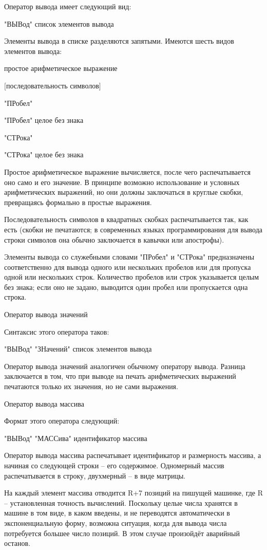 \documentclass[11pt]{article}
\begin{document}
Оператор вывода имеет следующий вид:

"ВЫВод" список элементов вывода

Элементы вывода в списке разделяются
запятыми. Имеются шесть видов
элементов вывода:

простое арифметическое выражение

$[$последовательность символов$]$

"ПРобел"

"ПРобел" целое без знака

"СТРока"

"СТРока" целое без знака

Простое арифметическое выражение
вычисляется, после чего
распечатывается оно само и его
значение. В принципе возможно
использование и условных
арифметических выражений, но они
должны заключаться в круглые скобки,
превращаясь формально в простые
выражения.

Последовательность символов в
квадратных скобках распечатывается
так, как есть (скобки не печатаются; в
современных языках программирования
для вывода строки символов она обычно
заключается в кавычки или апострофы).

Элементы вывода со служебными словами
"ПРобел" и "СТРока" предназначены
соответственно для вывода одного или
нескольких пробелов или для пропуска
одной или нескольких строк. Количество
пробелов или строк указывается целым
без знака; если оно не задано, выводится
один пробел или пропускается одна
строка.

Оператор вывода значений

Синтаксис этого оператора таков:

"ВЫВод" "ЗНачений" список элементов
вывода

Оператор вывода значений аналогичен
обычному оператору вывода. Разница
заключается в том, что при выводе на
печать арифметических выражений
печатаются только их значения, но не
сами выражения.

Оператор вывода массива

Формат этого оператора следующий:

"ВЫВод" "МАССива" идентификатор массива

Оператор вывода массива распечатывает
идентификатор и размерность массива, а
начиная со следующей строки – его
содержимое. Одномерный массив
распечатывается в строку, двухмерный –
в виде матрицы.

На каждый элемент массива отводится R+7
позиций на пишущей машинке, где R –
установленная точность вычислений.
Поскольку целые числа хранятся в
машине в том виде, в каком введены, и не
переводятся автоматически в
экспоненциальную форму, возможна
ситуация, когда для вывода числа
потребуется большее число позиций. В
этом случае произойдёт аварийный
останов.
\end{document}
